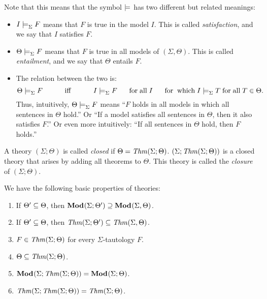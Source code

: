\begin{notation}
Note that this means that the symbol $\models$ has two different but related meanings:
\begin{itemize}
\item $I\models^{}_{\Sigma}F$ means that $F$ is true in the model $I$. This is called \emph{satisfaction}, and we say that $I$ satisfies $F$.
\item $\Theta\models^{}_{\Sigma}F$ means that $F$ is true in all models of $(\Sigma,\Theta)$. This is called \emph{entailment}, and we say that $\Theta$ entails $F$.
\item The relation between the two is:
\[\moda{\Theta}{\Sigma}{F} \tb\tb\miff\tb\tb \moda{I}{\Sigma}{F} \tb\mforall I \tb \mtext{for}\mtext{which} \moda{I}{\Sigma}{T} \mforall T\in\Theta.\]
Thus, intuitively, $\Theta\models^{}_{\Sigma}F$ means ``$F$ holds in all models in which all sentences in $\Theta$ hold.'' Or ``If a model satisfies all sentences in $\Theta$, then it also satisfies $F$.'' Or even more intuitively: ``If all sentences in $\Theta$ hold, then $F$ holds.''
\end{itemize}
\end{notation}
\medskip

\begin{definition}
A theory $(\Sigma;\Theta)$ is called \emph{closed} if $\Theta=\mathit{Thm}(\Sigma;\Theta)$.
$(\Sigma;\mathit{Thm}(\Sigma;\Theta))$ is a closed theory that arises by adding all theorems to $\Theta$. This theory is called the \emph{closure} of $(\Sigma;\Theta)$.
\end{definition}

\begin{theorem}\label{thm:galois:1}
We have the following basic properties of theories:
\begin{enumerate}
\item If $\Theta'\subseteq \Theta$, then ${\mathbf{Mod}^{}}(\Sigma;\Theta')\supseteq{\mathbf{Mod}^{}}(\Sigma,\Theta)$.
\item If $\Theta'\subseteq \Theta$, then $\mathit{Thm}(\Sigma;\Theta')\subseteq\mathit{Thm}(\Sigma,\Theta)$.
\item $F\in\mathit{Thm}(\Sigma;\Theta)$ for every $\Sigma$-tautology $F$.
\item $\Theta\subseteq\mathit{Thm}(\Sigma;\Theta)$.
\item ${\mathbf{Mod}^{}}(\Sigma;\mathit{Thm}(\Sigma;\Theta))={\mathbf{Mod}^{}}(\Sigma;\Theta)$.
\item $\mathit{Thm}(\Sigma;\mathit{Thm}(\Sigma;\Theta))=\mathit{Thm}(\Sigma;\Theta)$.
\end{enumerate}
\end{theorem}

